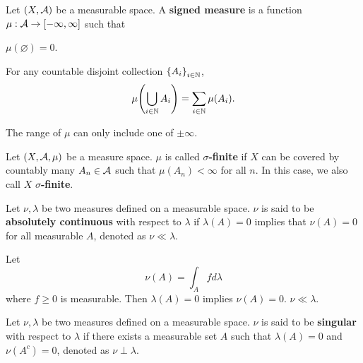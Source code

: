 \begin{definition}
    Let $(X,\mathcal{A})$ be a measurable space. A \textbf{signed measure} 
    is a function $\mu:\mathcal{A}\to [-\infty,\infty]$ such that
    \begin{thmenum}
        \item $\mu(\varnothing) = 0$.
        \item For any countable disjoint collection $\left\{ {A_i} \right\}_{i\in\mathbb{N}}$, 
        \begin{equation*}
            \mu\pth{\bigcup_{i\in\N} A_i} = \sum_{i\in\N} \mu(A_i).
        \end{equation*}
    \end{thmenum}
\end{definition}
\begin{remark}
    The range of $\mu$ can only include one of $\pm\infty$.
\end{remark}

\begin{definition}
    Let $(X,\mathcal{A},\mu)$ be a measure space. $\mu$ is called 
    \textbf{$\sigma$-finite} if $X$ can be covered by countably many 
    $A_n\in\mathcal{A}$ such that $\mu(A_n)<\infty$ for all $n$. In this case,
    we also call $X$ \textbf{$\sigma$-finite}.
\end{definition}

\begin{definition}
    Let $\nu,\lambda$ be two measures defined on a measurable space. $\nu$ 
    is said to be \textbf{absolutely continuous} with respect to $\lambda$ 
    if $\lambda(A) = 0$ implies that $\nu(A) = 0$ for all measurable $A$, 
    denoted as $\nu\ll\lambda$. 
\end{definition} 

\begin{example}
    Let 
    \begin{equation*}
        \nu(A) = \int_A fd\lambda
    \end{equation*}
    where $f\geq 0$ is measurable. Then $\lambda(A) = 0$ implies $\nu(A) = 0$. 
    $\nu\ll\lambda$. 
\end{example}

\begin{definition}
    Let $\nu,\lambda$ be two measures defined on a measurable space. $\nu$ 
    is said to be \textbf{singular} with respect to $\lambda$ if there exists 
    a measurable set $A$ such that $\lambda(A) = 0$ and $\nu(A^c) = 0$, 
    denoted as $\nu\perp\lambda$.
\end{definition}

